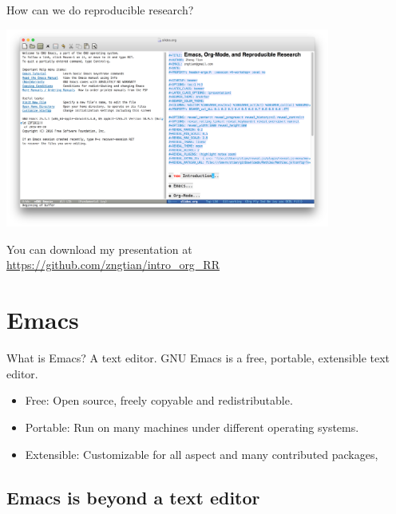 \documentclass[presentation]{beamer}
\begin{document}
\begin{frame}[label={sec:org32ddb60}]{How can we do reproducible research?}
\begin{center}
\includegraphics[width=0.8\textwidth]{figure/emacs_startup.png}
\end{center}

You can download my presentation at
\url{https://github.com/zngtian/intro\_org\_RR}
\end{frame}


\section{Emacs}
\label{sec:org11c1679}

\begin{frame}[label={sec:orga16f371}]{What is Emacs? A text editor.}
GNU Emacs is a free, portable, extensible text editor.

\begin{itemize}
\item Free: Open source, freely copyable and redistributable.
\item Portable: Run on many machines under different operating systems.
\item Extensible: Customizable for all aspect and  many contributed packages,
\end{itemize}
\end{frame}


\subsection{Emacs is beyond a text editor}
\label{sec:org6a7b702}
\end{document}
